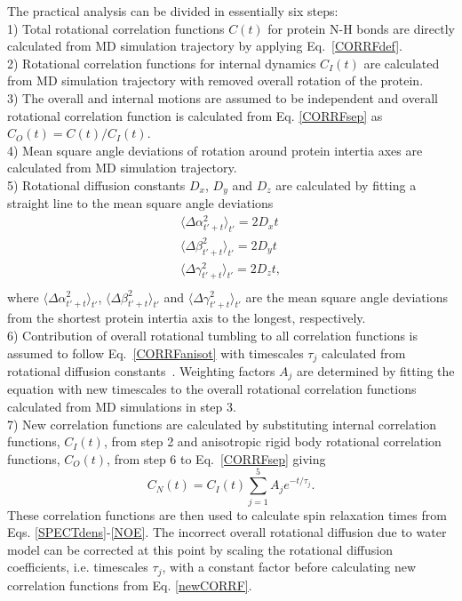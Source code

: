 \documentclass[pre,aps,floatfix,authordate1-4,twocolumn]{revtex4-1}
\begin{document}
The practical analysis can be divided in essentially six steps: \\
1) Total rotational correlation functions $C(t)$
for protein N-H bonds are directly calculated from MD simulation trajectory
by applying Eq.~\ref{CORRFdef}. \\
2) Rotational correlation functions for internal
dynamics $C_I(t)$ are calculated from MD simulation trajectory
with removed overall rotation of the protein. \\
3) The overall and internal motions are assumed to be independent and overall
rotational correlation function is calculated from Eq. \ref{CORRFsep} as $C_O(t)=C(t)/C_I(t)$. \\
4) Mean square angle deviations of rotation around protein intertia axes
are calculated from MD simulation trajectory. \\
5) Rotational diffusion constants $D_x$, $D_y$ and $D_z$ are calculated by fitting a straight line
to the mean square angle deviations 
\begin{equation}\label{DIFFdef}
  \begin{aligned}
    \langle \Delta \alpha_{t'+t}^2 \rangle_{t'} = 2 D_{x} t \\
    \langle \Delta \beta_{t'+t}^2 \rangle_{t'} = 2 D_{y} t \\
    \langle \Delta \gamma_{t'+t}^2 \rangle_{t'} = 2 D_{z} t, \\
  \end{aligned}
\end{equation}
where $\langle \Delta \alpha_{t'+t}^2 \rangle_{t'}$,
$\langle \Delta \beta_{t'+t}^2 \rangle_{t'}$ and
$\langle \Delta \gamma_{t'+t}^2 \rangle_{t'}$ are
the mean square angle deviations from the shortest protein
intertia axis to the longest, respectively.\\
6) Contribution of overall rotational tumbling to all correlation
functions is assumed to follow Eq.~\ref{CORRFanisot} with
timescales $\tau_j$ calculated from rotational diffusion constants~\cite{Note1}.
Weighting factors $A_j$ are determined by fitting the equation with new timescales
to the overall rotational correlation functions calculated from MD simulations in step 3. \\
7) New correlation functions are calculated by substituting
internal correlation functions, $C_I(t)$, from step 2 and anisotropic rigid body
rotational correlation functions, $C_O(t)$, from step 6 to
Eq.~\ref{CORRFsep} giving
\begin{equation}\label{newCORRF}
  C_N(t)=C_I(t)\sum_{j=1}^5 A_j e^{-t/\tau_j}.
\end{equation}
These correlation functions are then used to calculate spin relaxation times
from Eqs. \ref{SPECTdens}-\ref{NOE}. The incorrect overall rotational
diffusion due to water model can be corrected at this point  by scaling the rotational diffusion
coefficients, i.e. timescales $\tau_j$, with a constant factor before calculating
new correlation functions from Eq. \ref{newCORRF}.
\end{document}
